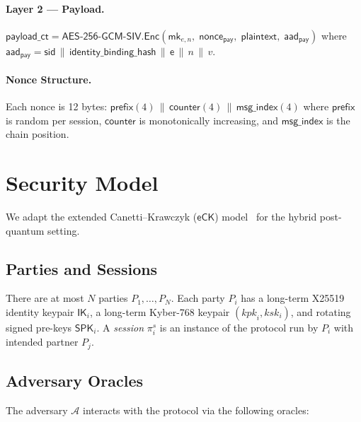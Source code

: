 \documentclass[11pt,a4paper]{article}
\theoremstyle{definition}
\theoremstyle{remark}
\newcommand{\advA}{\mathcal{A}}
\newcommand{\AEAD}{\mathsf{AES\text{-}256\text{-}GCM\text{-}SIV}}
\newcommand{\Enc}{\mathsf{Enc}}
\newcommand{\eCK}{\mathsf{eCK}}
\newcommand{\IK}{\mathsf{IK}}
\newcommand{\SPK}{\mathsf{SPK}}
\newcommand{\mk}{\mathsf{mk}}
\newcommand{\sid}{\mathsf{sid}}
\newcommand{\epoch}{\mathsf{e}}
\newcommand{\concat}{\,\|\,}
\begin{document}
\paragraph{Layer 2 --- Payload.}
$\mathsf{payload\_ct} = \AEAD.\Enc(\mk_{e,n},\; \mathsf{nonce}_{\mathsf{pay}},\;
\mathsf{plaintext},\; \mathsf{aad}_{\mathsf{pay}})$
where $\mathsf{aad}_{\mathsf{pay}} = \sid \concat \mathsf{identity\_binding\_hash}
\concat \epoch \concat n \concat v$.

\paragraph{Nonce Structure.}
Each nonce is 12 bytes: $\mathsf{prefix}(4) \concat \mathsf{counter}(4) \concat
\mathsf{msg\_index}(4)$ where $\mathsf{prefix}$ is random per session,
$\mathsf{counter}$ is monotonically increasing, and $\mathsf{msg\_index}$
is the chain position.


\section{Security Model}
\label{sec:model}

We adapt the extended Canetti--Krawczyk ($\eCK$)
model~\cite{lamacchia2007} for the hybrid post-quantum setting.

\subsection{Parties and Sessions}

There are at most $N$ parties $P_1, \ldots, P_N$.  Each party $P_i$ has a
long-term X25519 identity keypair $\IK_i$, a long-term Kyber-768 keypair
$(\mathit{kpk}_i, \mathit{ksk}_i)$, and rotating signed pre-keys $\SPK_i$.
A \emph{session} $\pi_i^s$ is an instance of the protocol run by $P_i$ with
intended partner $P_j$.

\subsection{Adversary Oracles}

The adversary $\advA$ interacts with the protocol via the following oracles:
\end{document}
